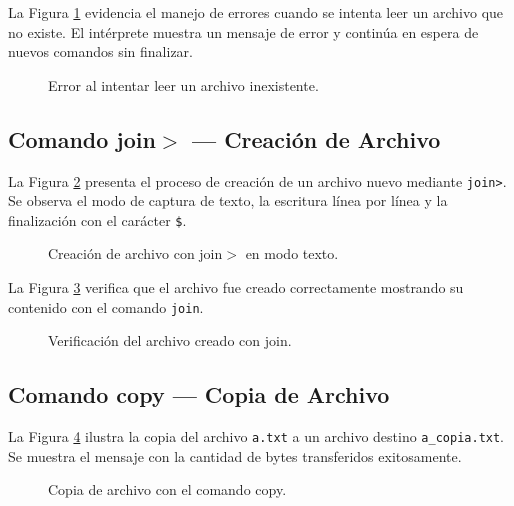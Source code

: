         La Figura \ref{fig:join_error} evidencia el manejo de errores cuando se intenta leer un archivo que no existe. El intérprete muestra un mensaje de error y continúa en espera de nuevos comandos sin finalizar.
        \begin{figure}[!h]
            \centering
            \caption{Error al intentar leer un archivo inexistente.}
            \label{fig:join_error}
        \end{figure}

    \subsection{Comando join$>$ — Creación de Archivo}
        La Figura \ref{fig:join_write} presenta el proceso de creación de un archivo nuevo mediante \texttt{join>}. Se observa el modo de captura de texto, la escritura línea por línea y la finalización con el carácter \texttt{\$}.
        \begin{figure}[!h]
            \centering
            \caption{Creación de archivo con join$>$ en modo texto.}
            \label{fig:join_write}
        \end{figure}

        La Figura \ref{fig:join_write_verif} verifica que el archivo fue creado correctamente mostrando su contenido con el comando \texttt{join}.
        \begin{figure}[!h]
            \centering
            \caption{Verificación del archivo creado con join.}
            \label{fig:join_write_verif}
        \end{figure}

    \subsection{Comando copy — Copia de Archivo}
        La Figura \ref{fig:copy} ilustra la copia del archivo \texttt{a.txt} a un archivo destino \texttt{a\_copia.txt}. Se muestra el mensaje con la cantidad de bytes transferidos exitosamente.
        \begin{figure}[!h]
            \centering
            \caption{Copia de archivo con el comando copy.}
            \label{fig:copy}
        \end{figure}

